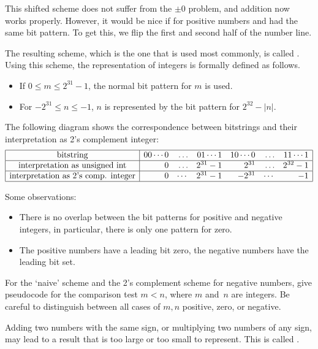 This shifted scheme does not suffer from the $\pm0$ problem, and addition now
works properly. However, it would be nice if for positive numbers
 and  had the same bit pattern. To get
this, we flip the first and second half of the number line.

The resulting scheme, which is the one that is used most commonly, is
called . Using this scheme,
the representation of integers is
formally defined as follows.
\begin{itemize}
\item If $0\leq m\leq 2^{31}-1$, the normal bit pattern for $m$ is
  used.
\item For $-2^{31}\leq n\leq -1$, $n$ is represented by the bit
  pattern for $2^{32}-|n|$.
\end{itemize}
The following diagram shows the correspondence between bitstrings and
their interpretation as 2's complement integer:
\[
\begin{array}{|c|rrrrrr|}
  \hline
  \hbox{bitstring}&
  00\cdots0&\ldots&01\cdots1&
  10\cdots0&\ldots&11\cdots1\\ \hline
  \hbox{interpretation as unsigned int}&
  0&\ldots&2^{31}-1&
  2^{31}&\ldots&2^{32}-1\\ \hline
  \hbox{interpretation as 2's comp. integer}&
  0&\cdots&2^{31}-1&
  -2^{31}&\cdots&-1\\
  \hline
\end{array}
\]

Some observations:
\begin{itemize}
\item There is no overlap between the bit patterns for positive and
  negative integers, in particular, there is only one pattern for zero.
\item The positive numbers have a leading bit zero, the negative
  numbers have the leading bit set.
\end{itemize}

\begin{exercise}
  \label{ex:compare-mn}
  For the `naive' scheme and the 2's complement scheme for negative
  numbers, give pseudocode for the comparison test $m<n$, where $m$
  and~$n$ are integers. Be careful to distinguish between all cases of
  $m,n$ positive, zero, or negative.
\end{exercise}

Adding two numbers with the same sign, or multiplying two numbers of
any sign, may lead to a result that is too
large or too small to represent. This is called .

